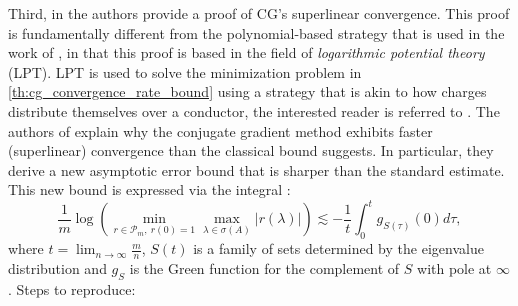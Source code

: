 Third, in \cite{cg_superlinear_Beckermann2001} the authors provide a proof of CG's superlinear convergence. This proof is fundamentally different from the polynomial-based strategy that is used in the work of \cite{cg_sharpened_convrate_Axelsson1976}, in that this proof is based in the field of \textit{logarithmic potential theory} (LPT). LPT is used to solve the minimization problem in \cref{th:cg_convergence_rate_bound} using a strategy that is akin to how charges distribute themselves over a conductor, the interested reader is referred to \cite{from_potential_theory_to_matrix_iterations_in_six_steps_Driscoll1998}. The authors of \cite{cg_superlinear_Beckermann2001} explain why the conjugate gradient method exhibits faster (superlinear) convergence than the classical bound suggests. In particular, they derive a new asymptotic error bound that is sharper than the standard estimate. This new bound is expressed via the integral \cite[Equation 1.8]{cg_superlinear_Beckermann2001}:
\begin{equation}
    \frac{1}{m} \log \left(\min_{r\in\mathcal{P}_m, \ r(0)=1}\max_{\lambda \in \sigma(A)}|r(\lambda)|\right) \lesssim-\frac{1}{t} \int_0^t g_{S(\tau)}(0) d \tau,
    \label{eq:cg_superlinear_Beckermann2001}
\end{equation}
where $t = \lim_{n\to\infty}\frac{m}{n}$, $S(t)$ is a family of sets determined by the eigenvalue distribution and $g_S$ is the Green function for the complement of $S$ with pole at $\infty$.
Steps to reproduce: 
